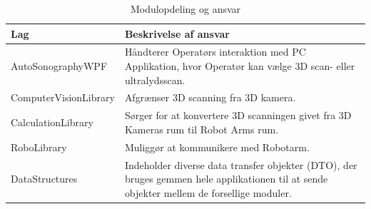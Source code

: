 \begin{table}[htb]
\begin{tabular}{ | l | p{} | }
\hline
\textbf{Lag} & \textbf{Beskrivelse af ansvar} \\\hline
AutoSonographyWPF & Håndterer Operatørs interaktion med PC Applikation, hvor Operatør kan vælge 3D scan- eller ultralydsscan.\\\hline
ComputerVisionLibrary & Afgrænser 3D scanning fra  3D kamera. \\\hline
CalculationLibrary & Sørger for at konvertere 3D scanningen givet fra 3D Kameras rum til Robot Arms rum. \\\hline
RoboLibrary & Muliggør at kommunikere med Robotarm.\\\hline
DataStructures & Indeholder diverse data transfer objekter (DTO), der bruges gemmen hele applikationen til at sende objekter mellem de forsellige moduler.\\\hline
\end{tabular}
\caption{Modulopdeling og ansvar}
\end{table}
